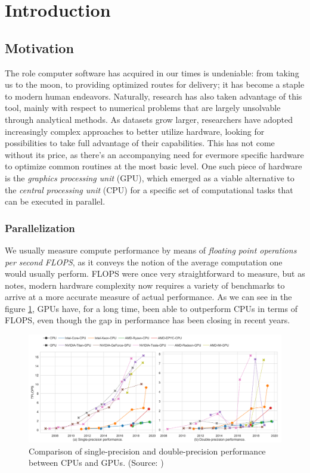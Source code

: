 \documentclass[conference, onecolumn]{IEEEtran}
\begin{document}
\listoftodos

\section{Introduction} \label{sec:intro}

\subsection{Motivation} \label{sec:intro:motivation}

The role computer software has acquired in our times is undeniable:
from taking us to the moon, to providing optimized routes for delivery; it has
become a staple to modern human endeavors.
Naturally, research has also taken advantage of this tool, mainly with
respect to numerical problems that are largely unsolvable through analytical
methods.
As datasets grow larger, researchers have adopted increasingly complex
approaches to better utilize hardware, looking for possibilities to take full
advantage of their capabilities.
This has not come without its price, as there's an accompanying need for
evermore specific hardware to optimize common routines at the most basic level.
One such piece of hardware is the \textit{graphics processing unit} (GPU),
which emerged as a viable alternative to the \textit{central processing unit}
(CPU) for a specific set of computational tasks that can be executed in
parallel.

\subsubsection{Parallelization} \label{sec:motivation:parallelization}

We usually measure compute performance by means of \textit{floating point
operations per second} \textit{FLOPS}, as it conveys the notion of the average
computation one would usually perform.
FLOPS were once very straightforward to measure, but as
\cite{dolbeau2018theoretical} notes, modern hardware complexity now
requires a variety of benchmarks to arrive at a more accurate measure of actual
performance.
As we can see in the figure \cref{fig:cpu-vs-gpu-flops}, GPUs have, for a long
time, been able to outperform CPUs in terms of FLOPS, even though the gap in
performance has been closing in recent years.

\begin{figure}[ht]
    \centering
    \includegraphics[width=0.9\linewidth]{gpu-vs-cpu-flops.png}
    \caption{Comparison of single-precision and double-precision performance
    between CPUs and GPUs. (Source: \cite{sun2019summarizing})}
    \label{fig:cpu-vs-gpu-flops}
\end{figure}
\end{document}
